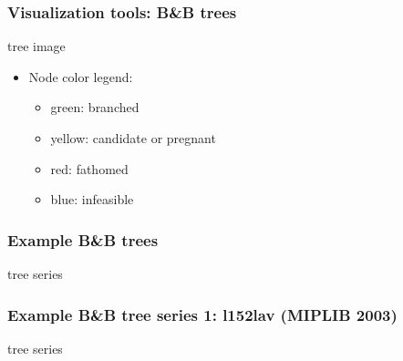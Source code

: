 \documentclass{beamer}
\begin{document}
\begin{frame}
\frametitle{Visualization tools: B\&B trees}

\begin{center}
tree image
\end{center}
\begin{itemize}
\item Node color legend:
    \begin{itemize}
    \item green: branched
    \item yellow: candidate or pregnant
    \item red: fathomed
    \item blue: infeasible
    \end{itemize} 
\end{itemize}
\end{frame}

\begin{frame}
\frametitle{Example B\&B trees}

\begin{center}
tree series
\end{center}
\end{frame}

\begin{frame}
\frametitle{Example B\&B tree series 1: l152lav (MIPLIB 2003)}

\begin{center}
tree series
\end{center}
\end{frame}

\end{document}

